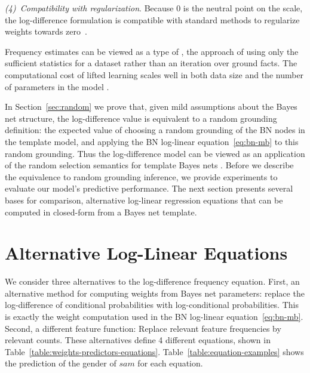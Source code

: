 \documentclass[twoside,11pt]{article}
\newcommand{\point}[1]{\noindent\emph{#1}.}
\begin{document}
\point{(4)~Compatibility with regularization} Because 0 is the neutral point on the scale, the log-difference formulation is compatible with standard methods to regularize weights towards zero~\cite{Huynh2008,Domingos2009}.  

Frequency estimates can be viewed as a type of , the approach of using only the sufficient statistics for a dataset rather than an iteration over ground facts. The computational cost of lifted learning scales well in both data size and the number of parameters in the model \cite{Schulte2013}. 

In Section~\ref{sec:random} we prove that, given mild assumptions about the Bayes net structure, the log-difference value is equivalent to a random grounding definition: the expected value of choosing a random grounding of the BN nodes in the template model, and applying the BN log-linear equation~\eqref{eq:bn-mb} to this random grounding. Thus the log-difference model can be viewed as an application of the random selection semantics for template Bayes nets \cite{Schulte2013}.
Before we describe the equivalence to random grounding inference, we provide experiments to evaluate our model's predictive performance.
The next section presents several bases for comparison, alternative log-linear regression equations that can be computed in closed-form from a Bayes net template. 



\section{Alternative Log-Linear Equations}\label{sec:alternatives}
We consider three alternatives to the log-difference frequency equation. First, an alternative method for computing weights from Bayes net parameters: replace the log-difference of conditional probabilities with log-conditional probabilities. This is exactly the weight computation used in the BN log-linear equation~\eqref{eq:bn-mb}. 
Second, a different feature function: Replace relevant feature frequencies by relevant counts. These alternatives define 4 different equations, shown in Table~\ref{table:weights-predictors-equations}. Table~\ref{table:equation-examples} shows the prediction of the gender of $sam$ for each equation.
\end{document}
